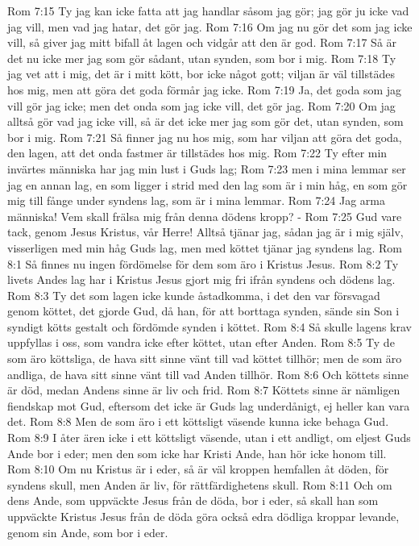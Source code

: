 Rom 7:15  Ty jag kan icke fatta att jag handlar såsom jag gör; jag gör ju icke vad jag vill, men vad jag hatar, det gör jag.
Rom 7:16  Om jag nu gör det som jag icke vill, så giver jag mitt bifall åt lagen och vidgår att den är god.
Rom 7:17  Så är det nu icke mer jag som gör sådant, utan synden, som bor i mig.
Rom 7:18  Ty jag vet att i mig, det är i mitt kött, bor icke något gott; viljan är väl tillstädes hos mig, men att göra det goda förmår jag icke.
Rom 7:19  Ja, det goda som jag vill gör jag icke; men det onda som jag icke vill, det gör jag.
Rom 7:20  Om jag alltså gör vad jag icke vill, så är det icke mer jag som gör det, utan synden, som bor i mig.
Rom 7:21  Så finner jag nu hos mig, som har viljan att göra det goda, den lagen, att det onda fastmer är tillstädes hos mig.
Rom 7:22  Ty efter min invärtes människa har jag min lust i Guds lag;
Rom 7:23  men i mina lemmar ser jag en annan lag, en som ligger i strid med den lag som är i min håg, en som gör mig till fånge under syndens lag, som är i mina lemmar.
Rom 7:24  Jag arma människa! Vem skall frälsa mig från denna dödens kropp? -
Rom 7:25  Gud vare tack, genom Jesus Kristus, vår Herre! Alltså tjänar jag, sådan jag är i mig själv, visserligen med min håg Guds lag, men med köttet tjänar jag syndens lag.
Rom 8:1  Så finnes nu ingen fördömelse för dem som äro i Kristus Jesus.
Rom 8:2  Ty livets Andes lag har i Kristus Jesus gjort mig fri ifrån syndens och dödens lag.
Rom 8:3  Ty det som lagen icke kunde åstadkomma, i det den var försvagad genom köttet, det gjorde Gud, då han, för att borttaga synden, sände sin Son i syndigt kötts gestalt och fördömde synden i köttet.
Rom 8:4  Så skulle lagens krav uppfyllas i oss, som vandra icke efter köttet, utan efter Anden.
Rom 8:5  Ty de som äro köttsliga, de hava sitt sinne vänt till vad köttet tillhör; men de som äro andliga, de hava sitt sinne vänt till vad Anden tillhör.
Rom 8:6  Och köttets sinne är död, medan Andens sinne är liv och frid.
Rom 8:7  Köttets sinne är nämligen fiendskap mot Gud, eftersom det icke är Guds lag underdånigt, ej heller kan vara det.
Rom 8:8  Men de som äro i ett köttsligt väsende kunna icke behaga Gud.
Rom 8:9  I åter ären icke i ett köttsligt väsende, utan i ett andligt, om eljest Guds Ande bor i eder; men den som icke har Kristi Ande, han hör icke honom till.
Rom 8:10  Om nu Kristus är i eder, så är väl kroppen hemfallen åt döden, för syndens skull, men Anden är liv, för rättfärdighetens skull.
Rom 8:11  Och om dens Ande, som uppväckte Jesus från de döda, bor i eder, så skall han som uppväckte Kristus Jesus från de döda göra också edra dödliga kroppar levande, genom sin Ande, som bor i eder.
